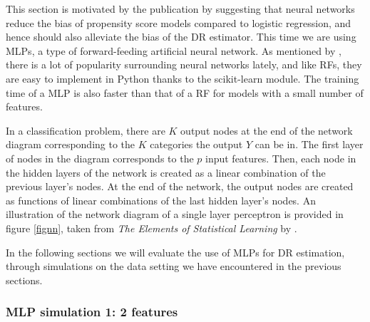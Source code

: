 \documentclass[12pt,twoside]{article}
\begin{document}
This section is motivated by the publication by \citet{setoguchi-nn} suggesting that neural networks reduce the bias of propensity score models compared to logistic regression, and hence should also alleviate the bias of the DR estimator. This time we are using MLPs, a type of forward-feeding artificial neural network. As mentioned by \citet{hastieESL}, there is a lot of popularity surrounding neural networks lately, and like RFs, they are easy to implement in Python thanks to the scikit-learn module. The training time of a MLP is also faster than that of a RF for models with a small number of features. 

In a classification problem, there are $K$ output nodes at the end of the network diagram corresponding to the $K$ categories the output $Y$ can be in. The first layer of nodes in the diagram corresponds to the $p$ input features. Then, each node in the hidden layers of the network is created as a linear combination of the previous layer's nodes. At the end of the network, the output nodes are created as functions of linear combinations of the last hidden layer's nodes. An illustration of the network diagram of a single layer perceptron is provided in figure \ref{fignn}, taken from \textit{The Elements of Statistical Learning} by \citet{hastieESL}.

In the following sections we will evaluate the use of MLPs for DR estimation, through simulations on the data setting we have encountered in the previous sections.

\subsubsection{MLP simulation 1: 2 features}
\end{document}
